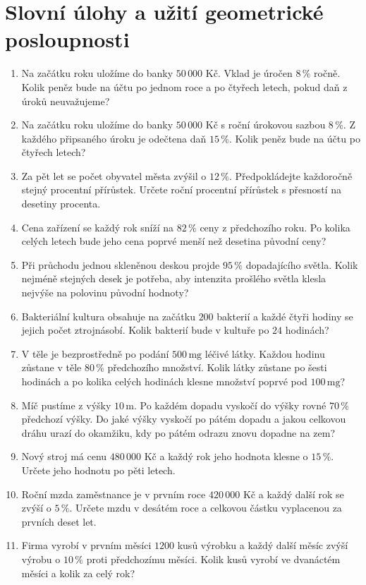 \documentclass[12pt,a4paper]{article}
\begin{document}
\section*{Slovní úlohy a užití geometrické posloupnosti}
\begin{enumerate}[label=\arabic*.,start=71]
    \item Na začátku roku uložíme do banky $50\,000$ Kč. Vklad je úročen $8\,\%$ ročně. Kolik peněz bude na účtu po jednom roce a po čtyřech letech, pokud daň z úroků neuvažujeme?
    \item Na začátku roku uložíme do banky $50\,000$ Kč s roční úrokovou sazbou $8\,\%$. Z každého připsaného úroku je odečtena daň $15\,\%$. Kolik peněz bude na účtu po čtyřech letech?
    \item Za pět let se počet obyvatel města zvýšil o $12\,\%$. Předpokládejte každoročně stejný procentní přírůstek. Určete roční procentní přírůstek s přesností na desetiny procenta.
    \item Cena zařízení se každý rok sníží na $82\,\%$ ceny z předchozího roku. Po kolika celých letech bude jeho cena poprvé menší než desetina původní ceny?
    \item Při průchodu jednou skleněnou deskou projde $95\,\%$ dopadajícího světla. Kolik nejméně stejných desek je potřeba, aby intenzita prošlého světla klesla nejvýše na polovinu původní hodnoty?
    \item Bakteriální kultura obsahuje na začátku $200$ bakterií a každé čtyři hodiny se jejich počet ztrojnásobí. Kolik bakterií bude v kultuře po $24$ hodinách?
    \item V těle je bezprostředně po podání $500\,\mathrm{mg}$ léčivé látky. Každou hodinu zůstane v těle $80\,\%$ předchozího množství. Kolik látky zůstane po šesti hodinách a po kolika celých hodinách klesne množství poprvé pod $100\,\mathrm{mg}$?
    \item Míč pustíme z výšky $10\,\mathrm{m}$. Po každém dopadu vyskočí do výšky rovné $70\,\%$ předchozí výšky. Do jaké výšky vyskočí po pátém dopadu a jakou celkovou dráhu urazí do okamžiku, kdy po pátém odrazu znovu dopadne na zem?
    \item Nový stroj má cenu $480\,000$ Kč a každý rok jeho hodnota klesne o $15\,\%$. Určete jeho hodnotu po pěti letech.
    \item Roční mzda zaměstnance je v prvním roce $420\,000$ Kč a každý další rok se zvýší o $5\,\%$. Určete mzdu v desátém roce a celkovou částku vyplacenou za prvních deset let.
    \item Firma vyrobí v prvním měsíci $1200$ kusů výrobku a každý další měsíc zvýší výrobu o $10\,\%$ proti předchozímu měsíci. Kolik kusů vyrobí ve dvanáctém měsíci a kolik za celý rok?

\end{enumerate}
\end{document}

